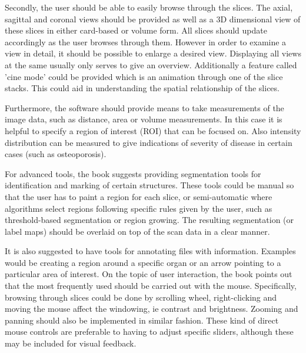 \documentclass[a4paper,11pt,titlepage]{article}
\begin{document}
Secondly, the user should be able to easily browse through the slices. The axial, sagittal and coronal views should be provided as well as a 3D dimensional view of these slices in either card-based or volume form. All slices should update accordingly as the user browses through them. However in order to examine a view in detail, it should be possible to enlarge a desired view. Displaying all views at the same usually only serves to give an overview. Additionally a feature called 'cine mode' could be provided which is an animation through one of the slice stacks. This could aid in understanding the spatial relationship of the slices.



Furthermore, the software should provide means to take measurements of the image data, such as distance, area or volume measurements. In this case it is helpful to specify a region of interest (ROI) that can be focused on. Also intensity distribution can be measured to give indications of severity of disease in certain cases (such as osteoporosis)\cite{book}.

 For advanced tools, the book suggests providing segmentation tools for identification and marking of certain structures. These tools could be manual so that the user has to paint a region for each slice, or semi-automatic where algorithms select regions following specific rules given by the user, such as threshold-based segmentation or region growing. The resulting segmentation (or label maps) should be overlaid on top of the scan data in a clear manner.
 
 It is also suggested to have tools for annotating files with information. Examples would be creating a region around a specific organ or an arrow pointing to a particular area of interest.
 On the topic of user interaction, the book points out that the most frequently used should be carried out with the mouse. Specifically, browsing through slices could be done by scrolling wheel, right-clicking and moving the mouse affect the windowing, ie contrast and brightness. Zooming and panning should also be implemented in similar fashion. These kind of direct mouse controls are preferable to having to adjust specific sliders, although these may be included for visual feedback.
 
\end{document}
